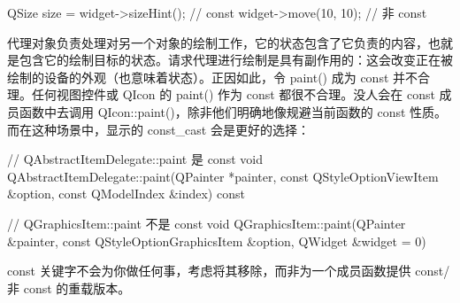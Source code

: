 \begin{cppcode}
QSize size = widget->sizeHint(); // const
widget->move(10, 10); // 非 const
\end{cppcode}

代理对象负责处理对另一个对象的绘制工作，它的状态包含了它负责的内容，也就是包含它的绘制目标的状态。请求代理进行绘制是具有副作用的：这会改变正在被绘制的设备的外观（也意味着状态）。正因如此，令 paint() 成为 const 并不合理。任何视图控件或 QIcon 的 paint() 作为 const 都很不合理。没人会在 const 成员函数中去调用 QIcon::paint()，除非他们明确地像规避当前函数的 const 性质。而在这种场景中，显示的 const\_cast 会是更好的选择：

\begin{cppcode}
// QAbstractItemDelegate::paint 是 const
void QAbstractItemDelegate::paint(QPainter *painter,
const QStyleOptionViewItem &option,
const QModelIndex &index) const
 
// QGraphicsItem::paint 不是 const
void QGraphicsItem::paint(QPainter &painter, 
const QStyleOptionGraphicsItem &option, 
QWidget &widget = 0)
\end{cppcode}

const 关键字不会为你做任何事，考虑将其移除，而非为一个成员函数提供 const/非 const 的重载版本。

